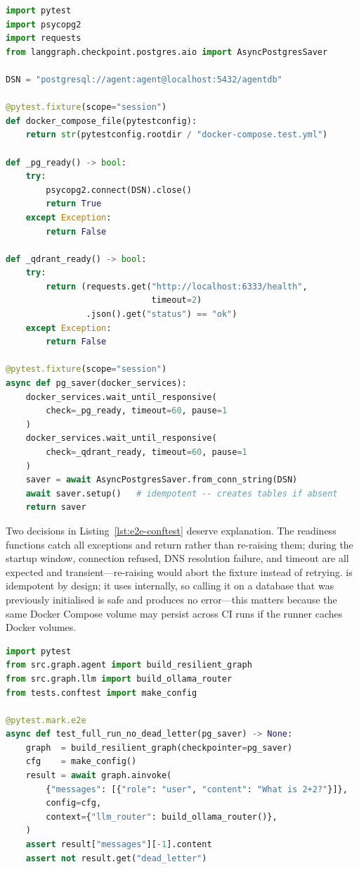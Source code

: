 \begin{lstlisting}[language=Python, caption={E2E session fixtures with
  Docker service readiness checks
  (\texttt{tests/e2e/conftest.py}).},
  label={lst:e2e-conftest}]
import pytest
import psycopg2
import requests
from langgraph.checkpoint.postgres.aio import AsyncPostgresSaver

DSN = "postgresql://agent:agent@localhost:5432/agentdb"

@pytest.fixture(scope="session")
def docker_compose_file(pytestconfig):
    return str(pytestconfig.rootdir / "docker-compose.test.yml")

def _pg_ready() -> bool:
    try:
        psycopg2.connect(DSN).close()
        return True
    except Exception:
        return False

def _qdrant_ready() -> bool:
    try:
        return (requests.get("http://localhost:6333/health",
                             timeout=2)
                .json().get("status") == "ok")
    except Exception:
        return False

@pytest.fixture(scope="session")
async def pg_saver(docker_services):
    docker_services.wait_until_responsive(
        check=_pg_ready, timeout=60, pause=1
    )
    docker_services.wait_until_responsive(
        check=_qdrant_ready, timeout=60, pause=1
    )
    saver = await AsyncPostgresSaver.from_conn_string(DSN)
    await saver.setup()   # idempotent -- creates tables if absent
    return saver
\end{lstlisting}

Two decisions in Listing~\ref{lst:e2e-conftest} deserve explanation.
The readiness functions catch all exceptions and return 
rather than re-raising them; during the startup window, connection
refused, DNS resolution failure, and timeout are all expected and
transient---re-raising would abort the fixture instead of retrying.
 is idempotent by design; it uses
 internally, so calling it on a
database that was previously initialised is safe and produces no
error---this matters because the same Docker Compose volume may persist
across CI runs if the runner caches Docker volumes.

\begin{lstlisting}[language=Python, caption={Full-agent E2E test
  (\texttt{tests/e2e/test\_full\_agent\_run.py}).},
  label={lst:e2e-test}]
import pytest
from src.graph.agent import build_resilient_graph
from src.graph.llm import build_ollama_router
from tests.conftest import make_config

@pytest.mark.e2e
async def test_full_run_no_dead_letter(pg_saver) -> None:
    graph  = build_resilient_graph(checkpointer=pg_saver)
    cfg    = make_config()
    result = await graph.ainvoke(
        {"messages": [{"role": "user", "content": "What is 2+2?"}]},
        config=cfg,
        context={"llm_router": build_ollama_router()},
    )
    assert result["messages"][-1].content
    assert not result.get("dead_letter")
\end{lstlisting}

